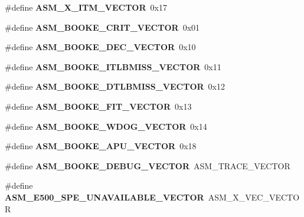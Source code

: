 \begin{DoxyCompactItemize}
\#define {\bfseries A\+S\+M\+\_\+X\+\_\+\+I\+T\+M\+\_\+\+V\+E\+C\+T\+OR}~0x17
\item 
\mbox{\label{group__ppc__exc_gae74c9a693358ef07afbb8637df1eff86}} 
\#define {\bfseries A\+S\+M\+\_\+\+B\+O\+O\+K\+E\+\_\+\+C\+R\+I\+T\+\_\+\+V\+E\+C\+T\+OR}~0x01
\item 
\mbox{\label{group__ppc__exc_ga786b70785004774f13ae0f1751b66a2f}} 
\#define {\bfseries A\+S\+M\+\_\+\+B\+O\+O\+K\+E\+\_\+\+D\+E\+C\+\_\+\+V\+E\+C\+T\+OR}~0x10
\item 
\mbox{\label{group__ppc__exc_ga5295c1e2047b864c8e00d08631efeaa2}} 
\#define {\bfseries A\+S\+M\+\_\+\+B\+O\+O\+K\+E\+\_\+\+I\+T\+L\+B\+M\+I\+S\+S\+\_\+\+V\+E\+C\+T\+OR}~0x11
\item 
\mbox{\label{group__ppc__exc_gad32b203aec08adfac28759aba7cd1e5d}} 
\#define {\bfseries A\+S\+M\+\_\+\+B\+O\+O\+K\+E\+\_\+\+D\+T\+L\+B\+M\+I\+S\+S\+\_\+\+V\+E\+C\+T\+OR}~0x12
\item 
\mbox{\label{group__ppc__exc_gab2d2d6f8c2d9db495523613b3e1ac516}} 
\#define {\bfseries A\+S\+M\+\_\+\+B\+O\+O\+K\+E\+\_\+\+F\+I\+T\+\_\+\+V\+E\+C\+T\+OR}~0x13
\item 
\mbox{\label{group__ppc__exc_gaba81b67701cf856d48a91481ff436327}} 
\#define {\bfseries A\+S\+M\+\_\+\+B\+O\+O\+K\+E\+\_\+\+W\+D\+O\+G\+\_\+\+V\+E\+C\+T\+OR}~0x14
\item 
\mbox{\label{group__ppc__exc_ga7d014134e93a0826ed182daa2c1e5b78}} 
\#define {\bfseries A\+S\+M\+\_\+\+B\+O\+O\+K\+E\+\_\+\+A\+P\+U\+\_\+\+V\+E\+C\+T\+OR}~0x18
\item 
\mbox{\label{group__ppc__exc_ga993b0338ec1af266e838d1443f5cf57f}} 
\#define {\bfseries A\+S\+M\+\_\+\+B\+O\+O\+K\+E\+\_\+\+D\+E\+B\+U\+G\+\_\+\+V\+E\+C\+T\+OR}~A\+S\+M\+\_\+\+T\+R\+A\+C\+E\+\_\+\+V\+E\+C\+T\+OR
\item 
\mbox{\label{group__ppc__exc_ga955a0a7701526f8be5647a0213adb945}} 
\#define {\bfseries A\+S\+M\+\_\+\+E500\+\_\+\+S\+P\+E\+\_\+\+U\+N\+A\+V\+A\+I\+L\+A\+B\+L\+E\+\_\+\+V\+E\+C\+T\+OR}~A\+S\+M\+\_\+X\+\_\+\+V\+E\+C\+\_\+\+V\+E\+C\+T\+OR

\end{DoxyCompactItemize}
